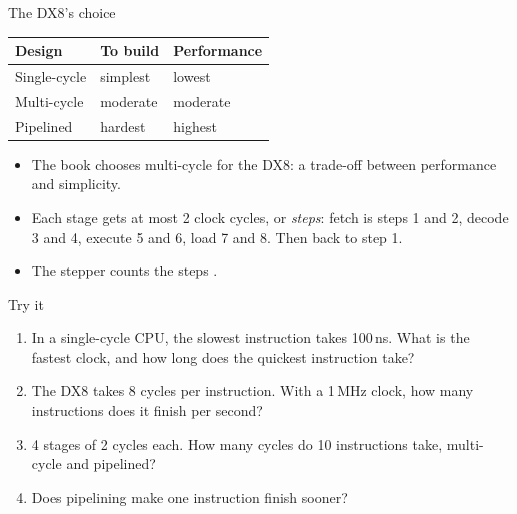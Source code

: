 \documentclass[10pt]{wosm-slides}
\begin{document}
\begin{frame}{The DX8's choice}
  \begin{center}
    \begin{tabular}{@{}lll@{}}
      \toprule
      Design & To build & Performance \\
      \midrule
      Single-cycle & simplest & lowest \\
      Multi-cycle & moderate & moderate \\
      Pipelined & hardest & highest \\
      \bottomrule
    \end{tabular}
  \end{center}

  \begin{itemize}
    \item The book chooses \alert{multi-cycle} for the DX8: a trade-off between
      performance and simplicity.
    \item Each stage gets at most 2 clock cycles, or \emph{steps}: fetch is steps 1
      and 2, decode 3 and 4, execute 5 and 6, load 7 and 8. Then back to step 1.
    \item The stepper counts the steps .
  \end{itemize}
\end{frame}

\begin{frame}{Try it}
  \begin{enumerate}
    \item In a single-cycle CPU, the slowest instruction takes 100\,ns. What is the
      fastest clock, and how long does the quickest instruction take?\par
    \item The DX8 takes 8 cycles per instruction. With a 1\,MHz clock, how many
      instructions does it finish per second?\par
    \item 4 stages of 2 cycles each. How many cycles do 10 instructions take,
      multi-cycle and pipelined?\par
    \item Does pipelining make one instruction finish sooner?\par
  \end{enumerate}
\end{frame}
\end{document}
